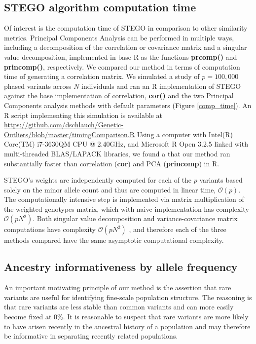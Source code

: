 \subsection{STEGO algorithm computation time}

Of interest is the computation time of STEGO in comparison to other
similarity metrics. Principal Components Analysis can be performed
in multiple ways, including a decomposition of the correlation or
covariance matrix and a singular value decomposition, implemented
in base R as the functions \textbf{prcomp()} and \textbf{princomp()},
respectively. We compared our method in terms of computation time
of generating a correlation matrix. We simulated a study of $p=100,000$
phased variants across $N$ individuals and ran an R implementation
of STEGO against the base implementation of correlation, \textbf{cor()}
and the two Principal Components analysis methods with default parameters
(Figure \ref{comp_time}). An R script implementing this
simulation is available at \\
 \url{https://github.com/dschlauch/Genetic-Outliers/blob/master/timingComparison.R}
Using a computer with Intel(R) Core(TM) i7-3630QM CPU @ 2.40GHz, and
Microsoft R Open 3.2.5 linked with multi-threaded BLAS/LAPACK libraries,
we found a that our method ran substantially faster than correlation
(\textbf{cor}) and PCA (\textbf{princomp}) in R. 

STEGO's weights are independently computed for each of the $p$ variants
based solely on the minor allele count and thus are computed in linear
time, $\mathcal{O}(p)$. The computationally intensive step is implemented
via matrix multiplication of the weighted genotypes matrix, which
with naive implementation has complexity $\mathcal{O}(pN^{2})$. Both
singular value decomposition and variance-covariance matrix computations
have complexity $\mathcal{O}(pN^{2})$ \cite{holmes2007fast}, and
therefore each of the three methods compared have the same asymptotic
computational complexity.

\subsection{Ancestry informativeness by allele frequency}

An important motivating principle of our method is the assertion that
rare variants are useful for identifying fine-scale population structure.
The reasoning is that rare variants are less stable than common variants
and can more easily become fixed at 0\%. It is reasonable to suspect
that rare variants are more likely to have arisen recently in the
ancestral history of a population and may therefore be informative
in separating recently related populations.

